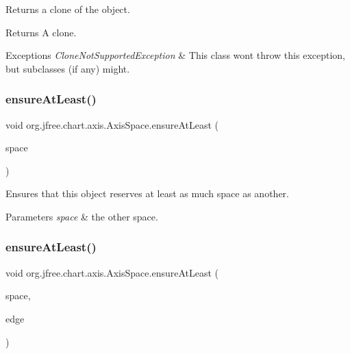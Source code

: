 Returns a clone of the object.

\begin{DoxyReturn}{Returns}
A clone.
\end{DoxyReturn}

\begin{DoxyExceptions}{Exceptions}
{\em Clone\+Not\+Supported\+Exception} & This class won\textquotesingle{}t throw this exception, but subclasses (if any) might. \\
\hline
\end{DoxyExceptions}
\mbox{\label{classorg_1_1jfree_1_1chart_1_1axis_1_1_axis_space_a4911a51d8be9bd032a8d8b15d562c4ea}} 
\subsubsection{\texorpdfstring{ensure\+At\+Least()}{ensureAtLeast()}\hspace{0.1cm}{\footnotesize\ttfamily [1/2]}}
{\footnotesize\ttfamily void org.\+jfree.\+chart.\+axis.\+Axis\+Space.\+ensure\+At\+Least (\begin{DoxyParamCaption}\item[{\mbox{\hyperlink{classorg_1_1jfree_1_1chart_1_1axis_1_1_axis_space}{Axis\+Space}}}]{space }\end{DoxyParamCaption})}

Ensures that this object reserves at least as much space as another.


\begin{DoxyParams}{Parameters}
{\em space} & the other space. \\
\hline
\end{DoxyParams}
\mbox{\label{classorg_1_1jfree_1_1chart_1_1axis_1_1_axis_space_a5fc18e5e08f2d8acc55b1da58ae1f2dd}} 
\subsubsection{\texorpdfstring{ensure\+At\+Least()}{ensureAtLeast()}\hspace{0.1cm}{\footnotesize\ttfamily [2/2]}}
{\footnotesize\ttfamily void org.\+jfree.\+chart.\+axis.\+Axis\+Space.\+ensure\+At\+Least (\begin{DoxyParamCaption}\item[{double}]{space,  }\item[{Rectangle\+Edge}]{edge }\end{DoxyParamCaption})}

